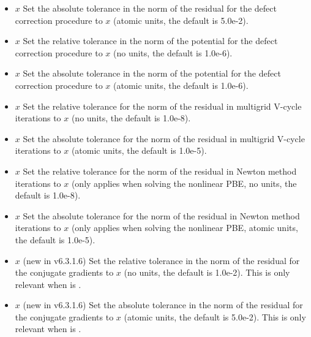 \documentclass[letterpaper,10pt,english]{sphinxmanual}
\begin{document}
\begin{itemize}
\item {} 
 \(x\) Set the absolute tolerance in the norm
of the residual for the defect correction procedure to \(x\)
(atomic units, the default is 5.0e-2).

\item {} 
 \(x\) Set the relative tolerance in the norm
of the potential for the defect correction procedure to \(x\) (no
units, the default is 1.0e-6).

\item {} 
 \(x\) Set the absolute tolerance in the norm
of the potential for the defect correction procedure to \(x\)
(atomic units, the default is 1.0e-6).

\item {} 
 \(x\) Set the relative tolerance for the norm
of the residual in multigrid V-cycle iterations to \(x\) (no
units, the default is 1.0e-8).

\item {} 
 \(x\) Set the absolute tolerance for the norm
of the residual in multigrid V-cycle iterations to \(x\) (atomic
units, the default is 1.0e-5).

\item {} 
 \(x\) Set the relative tolerance for the
norm of the residual in Newton method iterations to \(x\) (only
applies when solving the nonlinear PBE, no units, the default is
1.0e-8).

\item {} 
 \(x\) Set the absolute tolerance for the
norm of the residual in Newton method iterations to \(x\) (only
applies when solving the nonlinear PBE, atomic units, the default is
1.0e-5).

\item {} 
 \(x\) (new in v6.3.1.6) Set the relative
tolerance in the norm of the residual for the conjugate gradients to
\(x\) (no units, the default is 1.0e-2). This is only relevant
when  is .

\item {} 
 \(x\) (new in v6.3.1.6) Set the absolute
tolerance in the norm of the residual for the conjugate gradients to
\(x\) (atomic units, the default is 5.0e-2). This is only
relevant when  is .

\end{itemize}
\end{document}
